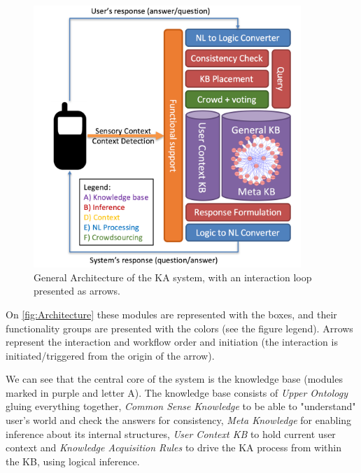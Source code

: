 \begin{figure}[htb]
	\centering
		\includegraphics[width=0.9\textwidth]{figures/architecture.png}
	\caption{General Architecture of the KA system, with an interaction loop
			 presented as arrows.}
	\label{fig:Architecture}
\end{figure}

On \autoref{fig:Architecture} these modules are represented with the boxes,
and their functionality groups are presented with the colors (see the figure
legend). Arrows represent the interaction and workflow order and initiation 
(the interaction is initiated/triggered from the origin of the arrow).

We can see that the central core of the
system is the knowledge base (modules marked in purple and letter A). The 
knowledge base consists of \emph{Upper Ontology} gluing everything together, 
\emph{Common Sense Knowledge} to be able to "understand" user's world and check
the answers for consistency, \emph{Meta Knowledge} for enabling inference about 
its internal structures, \emph{User Context KB} to hold current user context and 
\emph{Knowledge Acquisition Rules} to drive the KA process from within the KB, 
using logical inference. 

